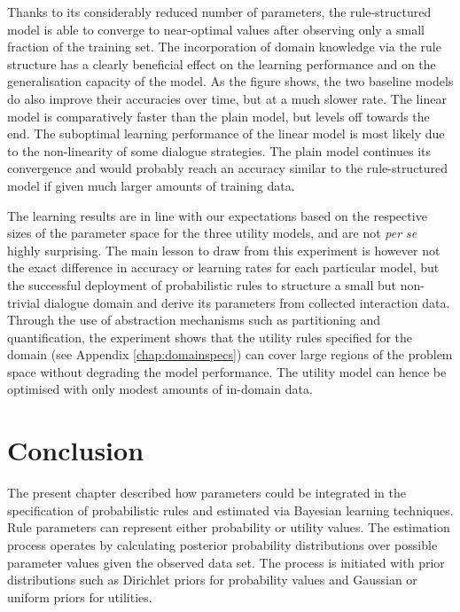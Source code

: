 Thanks to its considerably reduced number of parameters, the rule-structured model is able to converge to near-optimal values after observing only a small fraction of the training set.  The incorporation of domain knowledge via the rule structure has a clearly beneficial effect on the learning performance and on the generalisation capacity of the model.  As the figure shows, the two baseline models do also improve their accuracies over time, but at a much slower rate.   The linear model is comparatively faster than the plain model, but levels off towards the end. The suboptimal learning performance of the linear model is most likely due to the non-linearity of some dialogue strategies.  The plain model continues its convergence and would probably reach an accuracy similar to the rule-structured model if given much larger amounts of training data. 

The learning results are in line with our expectations based on the respective sizes of the parameter space for the three utility models, and are not \textit{per se} highly surprising.  The main lesson to draw from this experiment is however not the exact difference in accuracy or learning rates for each particular model, but the successful deployment of probabilistic rules to structure a small but non-trivial dialogue domain and derive its parameters from collected interaction data.  Through the use of abstraction mechanisms such as partitioning and quantification, the experiment shows that the utility rules specified for the domain (see Appendix \ref{chap:domainspecs}) can cover large regions of the problem space without degrading the model performance.  The utility model can hence be optimised with only modest amounts of in-domain data. 


\section{Conclusion}
\label{sec:woz-conclusions}

The present chapter described how parameters could be integrated in the specification of probabilistic rules and estimated via Bayesian learning techniques.  Rule parameters can represent either probability or utility values. The estimation process operates by calculating posterior probability distributions over possible parameter values given the observed data set. The process is initiated with prior distributions such as Dirichlet priors for probability values and Gaussian or uniform priors for utilities. 

